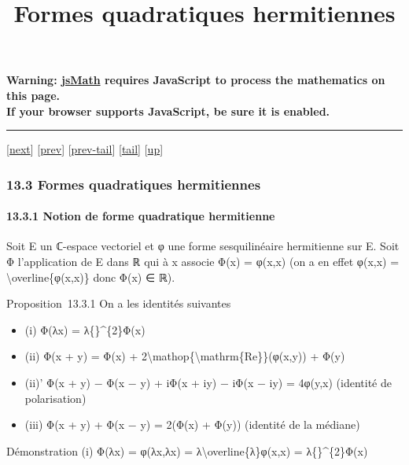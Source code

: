 \documentclass[]{article}
\title{Formes quadratiques hermitiennes}
\author{}
\date{}
\begin{document}
\maketitle

\textbf{Warning: \href{http://www.math.union.edu/locate/jsMath}{jsMath}
requires JavaScript to process the mathematics on this page.\\ If your
browser supports JavaScript, be sure it is enabled.}

\begin{center}\rule{3in}{0.4pt}\end{center}

{[}\href{coursse76.html}{next}{]} {[}\href{coursse74.html}{prev}{]}
{[}\href{coursse74.html\#tailcoursse74.html}{prev-tail}{]}
{[}\hyperref[tailcoursse75.html]{tail}{]}
{[}\href{coursch14.html\#coursse75.html}{up}{]}

\subsubsection{13.3 Formes quadratiques hermitiennes}

\paragraph{13.3.1 Notion de forme quadratique hermitienne}

Soit E un ℂ-espace vectoriel et φ une forme sesquilinéaire hermitienne
sur E. Soit Φ l'application de E dans ℝ qui à x associe Φ(x) = φ(x,x)
(on a en effet φ(x,x) = \textbackslash{}overline\{φ(x,x)\} donc Φ(x) ∈
ℝ).

Proposition~13.3.1 On a les identités suivantes

\begin{itemize}
\itemsep1pt\parskip0pt
\item
  (i) Φ(λx) = \textbar{}λ\{\textbar{}\}\^{}\{2\}Φ(x)
\item
  (ii) Φ(x + y) = Φ(x) +
  2\textbackslash{}mathop\{\textbackslash{}mathrm\{Re\}\}(φ(x,y)) + Φ(y)
\item
  (ii)' Φ(x + y) − Φ(x − y) + iΦ(x + iy) − iΦ(x − iy) = 4φ(y,x)
  (identité de polarisation)
\item
  (iii) Φ(x + y) + Φ(x − y) = 2(Φ(x) + Φ(y)) (identité de la médiane)
\end{itemize}

Démonstration (i) Φ(λx) = φ(λx,λx) =
λ\textbackslash{}overline\{λ\}φ(x,x) =
\textbar{}λ\{\textbar{}\}\^{}\{2\}Φ(x)
\end{document}
